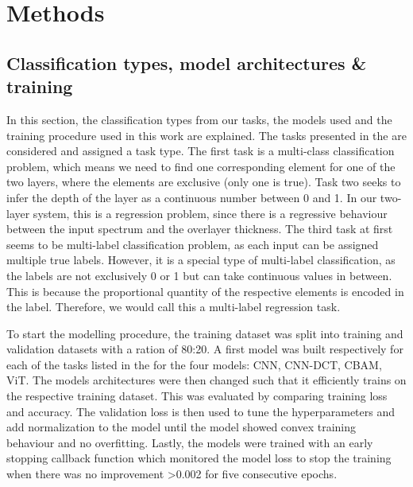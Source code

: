 
\chapter{Methods} %

\label{Chapter3} %







\section{Classification types, model architectures \& training}
In this section, the classification types from our tasks, the models used and the training procedure used in this work are explained.
The tasks presented in the  are considered and assigned a task type.
The first task is a multi-class classification problem, which means we need to find one corresponding element for one of the two layers, where the elements are exclusive (only one is true). Task two seeks to infer the depth of the layer as a continuous number between 0 and 1. In our two-layer system, this is a regression problem, since there is a regressive behaviour between the input spectrum and the overlayer thickness. The third task at first seems to be multi-label classification problem, as each input can be assigned multiple true labels. However, it is a special type of multi-label classification, as the labels are not exclusively 0 or 1 but can take continuous values in between. This is because the proportional quantity of the respective elements is encoded in the label. Therefore, we would call this a multi-label regression task.

To start the modelling procedure, the training dataset was split into training and validation datasets with a ration of 80:20. A first model was built respectively for each of the tasks listed in the  for the four models: CNN, CNN-DCT, CBAM, ViT. The models architectures were then changed such that it efficiently trains on the respective training dataset. This was evaluated by comparing training loss and accuracy.
The validation loss is then used to tune the hyperparameters and add normalization to the model until the model showed convex training behaviour and no overfitting. Lastly, the models were trained with an early stopping callback function which monitored the model loss to stop the training when there was no improvement >0.002 for five consecutive epochs.

